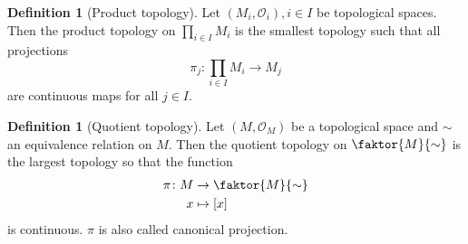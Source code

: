 \documentclass[a4paper,11pt,titlepage, article, oneside]{memoir}
\numberwithin{equation}{section}
\theoremstyle{definition}
\newtheorem{definition}[theorem]{Definition}
\theoremstyle{remark}
\begin{document}
\begin{definition}[Product topology]
Let $(M_i, \mathcal{O}_i), i \in I$ be topological spaces. Then the product topology on $\prod_{i \in I} M_i$ is the smallest topology such that all projections
$$
\pi_j \colon \prod_{i \in I} M_i \rightarrow M_j
$$
are continuous maps for all $j \in I$.
\end{definition}

\begin{definition}[Quotient topology]
Let $(M, \mathcal{O}_M)$ be a topological space and $\sim$ an equivalence relation on $M$. Then the quotient topology on $\faktor{M}{\sim}$ is the largest topology so that the function
\begin{align*}
\pi \colon M &\rightarrow \faktor{M}{\sim} \\
x &\mapsto [x]
\end{align*}
is continuous. $\pi$ is also called canonical projection.
\end{definition}
\end{document}
